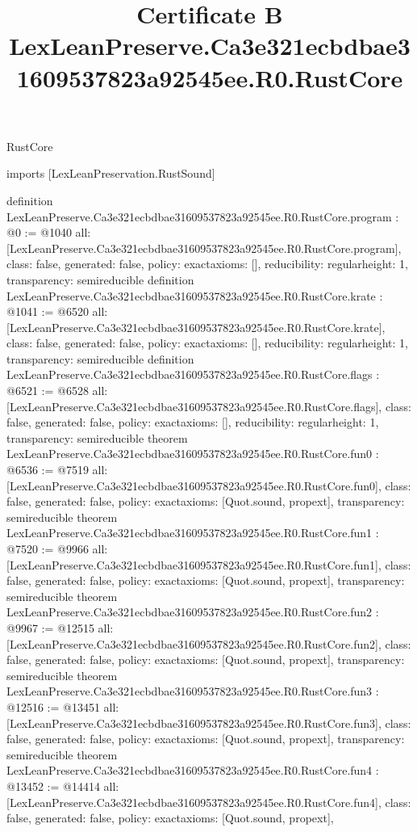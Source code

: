 \begin{lexlean}{RustCore}
\title{Certificate B LexLeanPreserve.Ca3e321ecbdbae31609537823a92545ee.R0.RustCore}
\begin{coremodule}
imports [LexLeanPreservation.RustSound]

definition LexLeanPreserve.Ca3e321ecbdbae31609537823a92545ee.R0.RustCore.program : @0 := @1040 {
  all: [LexLeanPreserve.Ca3e321ecbdbae31609537823a92545ee.R0.RustCore.program],
  class: false,
  generated: false,
  policy: exact{axioms: []},
  reducibility: regular{height: 1},
  transparency: semireducible
}
definition LexLeanPreserve.Ca3e321ecbdbae31609537823a92545ee.R0.RustCore.krate : @1041 := @6520 {
  all: [LexLeanPreserve.Ca3e321ecbdbae31609537823a92545ee.R0.RustCore.krate],
  class: false,
  generated: false,
  policy: exact{axioms: []},
  reducibility: regular{height: 1},
  transparency: semireducible
}
definition LexLeanPreserve.Ca3e321ecbdbae31609537823a92545ee.R0.RustCore.flags : @6521 := @6528 {
  all: [LexLeanPreserve.Ca3e321ecbdbae31609537823a92545ee.R0.RustCore.flags],
  class: false,
  generated: false,
  policy: exact{axioms: []},
  reducibility: regular{height: 1},
  transparency: semireducible
}
theorem LexLeanPreserve.Ca3e321ecbdbae31609537823a92545ee.R0.RustCore.fun0 : @6536 := @7519 {
  all: [LexLeanPreserve.Ca3e321ecbdbae31609537823a92545ee.R0.RustCore.fun0],
  class: false,
  generated: false,
  policy: exact{axioms: [Quot.sound, propext]},
  transparency: semireducible
}
theorem LexLeanPreserve.Ca3e321ecbdbae31609537823a92545ee.R0.RustCore.fun1 : @7520 := @9966 {
  all: [LexLeanPreserve.Ca3e321ecbdbae31609537823a92545ee.R0.RustCore.fun1],
  class: false,
  generated: false,
  policy: exact{axioms: [Quot.sound, propext]},
  transparency: semireducible
}
theorem LexLeanPreserve.Ca3e321ecbdbae31609537823a92545ee.R0.RustCore.fun2 : @9967 := @12515 {
  all: [LexLeanPreserve.Ca3e321ecbdbae31609537823a92545ee.R0.RustCore.fun2],
  class: false,
  generated: false,
  policy: exact{axioms: [Quot.sound, propext]},
  transparency: semireducible
}
theorem LexLeanPreserve.Ca3e321ecbdbae31609537823a92545ee.R0.RustCore.fun3 : @12516 := @13451 {
  all: [LexLeanPreserve.Ca3e321ecbdbae31609537823a92545ee.R0.RustCore.fun3],
  class: false,
  generated: false,
  policy: exact{axioms: [Quot.sound, propext]},
  transparency: semireducible
}
theorem LexLeanPreserve.Ca3e321ecbdbae31609537823a92545ee.R0.RustCore.fun4 : @13452 := @14414 {
  all: [LexLeanPreserve.Ca3e321ecbdbae31609537823a92545ee.R0.RustCore.fun4],
  class: false,
  generated: false,
  policy: exact{axioms: [Quot.sound, propext]},
}
\end{coremodule}
\end{lexlean}
